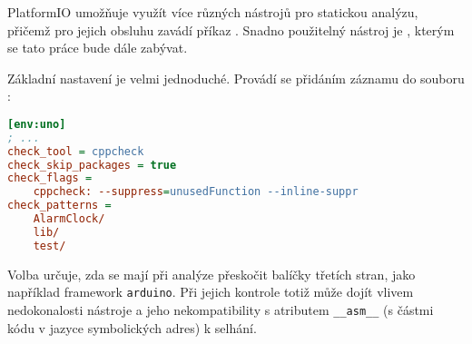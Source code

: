 PlatformIO umožňuje využít více různých nástrojů pro statickou analýzu, přičemž
pro jejich obsluhu zavádí příkaz . Snadno použitelný
nástroj je , kterým se tato práce bude dále zabývat.

Základní nastavení je velmi jednoduché. Provádí se přidáním záznamu do souboru
:
\begin{lstlisting}[language=Ini]
[env:uno]
; ...
check_tool = cppcheck
check_skip_packages = true
check_flags = 
	cppcheck: --suppress=unusedFunction --inline-suppr
check_patterns = 
	AlarmClock/
	lib/
	test/
\end{lstlisting}
Volba  určuje, zda se mají při analýze přeskočit
balíčky třetích stran, jako například framework \texttt{arduino}. Při jejich
kontrole totiž může dojít vlivem nedokonalosti nástroje 
a jeho nekompatibility s atributem \lstinline[language={[GNU]C++}]!__asm__!
(s částmi kódu v jazyce symbolických adres) k selhání.

